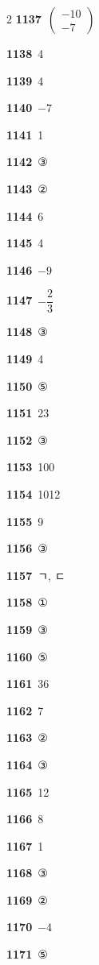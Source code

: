 \documentclass[10pt,a4paper]{article}
\begin{document}
\begin{multicols}{2}
\noindent\textbf{1137}\ $\begin{pmatrix} -10 \\ -7 \end{pmatrix}$\par
\noindent\textbf{1138}\ 4\par
\noindent\textbf{1139}\ 4\par
\noindent\textbf{1140}\ $-7$\par
\noindent\textbf{1141}\ 1\par
\noindent\textbf{1142}\ ③\par
\noindent\textbf{1143}\ ②\par
\noindent\textbf{1144}\ 6\par
\noindent\textbf{1145}\ 4\par
\noindent\textbf{1146}\ $-9$\par
\noindent\textbf{1147}\ $-\dfrac{2}{3}$\par
\noindent\textbf{1148}\ ③\par
\noindent\textbf{1149}\ 4\par
\noindent\textbf{1150}\ ⑤\par
\noindent\textbf{1151}\ 23\par
\noindent\textbf{1152}\ ③\par
\noindent\textbf{1153}\ 100\par
\noindent\textbf{1154}\ 1012\par
\noindent\textbf{1155}\ 9\par
\noindent\textbf{1156}\ ③\par
\noindent\textbf{1157}\ ㄱ, ㄷ\par
\noindent\textbf{1158}\ ①\par
\noindent\textbf{1159}\ ③\par
\noindent\textbf{1160}\ ⑤\par
\noindent\textbf{1161}\ 36\par
\noindent\textbf{1162}\ 7\par
\noindent\textbf{1163}\ ②\par
\noindent\textbf{1164}\ ③\par
\noindent\textbf{1165}\ 12\par
\noindent\textbf{1166}\ 8\par
\noindent\textbf{1167}\ 1\par
\noindent\textbf{1168}\ ③\par
\noindent\textbf{1169}\ ②\par
\noindent\textbf{1170}\ $-4$\par
\noindent\textbf{1171}\ ⑤\par

\end{multicols}
\end{document}
